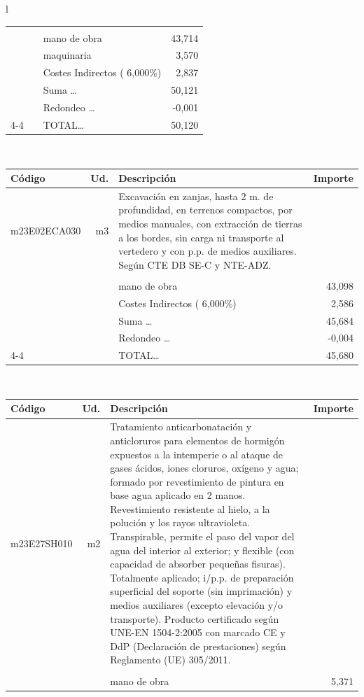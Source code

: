 \documentclass{book}%
\begin{document}
\begin{longtable}{l}
\begin{tabular}{l r p{60mm} r}
&&&\\%
&&mano de obra&    43,714\\%
&&maquinaria&     3,570\\%
&&Costes Indirectos (     6,000\%)&     2,837\\%
&&Suma \ldots&    50,121\\%
&&Redondeo \ldots&    {-}0,001\\%
\cline{4-4}%
&&TOTAL\ldots&    50,120\\%
\end{tabular}\\%
\begin{tabular}{l r p{60mm} r}%
Código&Ud.&Descripción&Importe\\%
\hline%
m23E02ECA030&m3&Excavación en zanjas, hasta 2 m. de profundidad, en terrenos compactos, por medios manuales, con extracción de tierras a los bordes, sin carga ni transporte al vertedero y con p.p. de medios auxiliares. Según CTE DB SE{-}C y NTE{-}ADZ.&\\%
&&&\\%
&&mano de obra&    43,098\\%
&&Costes Indirectos (     6,000\%)&     2,586\\%
&&Suma \ldots&    45,684\\%
&&Redondeo \ldots&    {-}0,004\\%
\cline{4-4}%
&&TOTAL\ldots&    45,680\\%
\end{tabular}\\%
\begin{tabular}{l r p{60mm} r}%
Código&Ud.&Descripción&Importe\\%
\hline%
m23E27SH010&m2&Tratamiento anticarbonatación y anticloruros para elementos de hormigón expuestos a la intemperie o al ataque de gases ácidos, iones cloruros, oxígeno y agua; formado por revestimiento de pintura en base agua aplicado en 2 manos. Revestimiento resistente al hielo, a la polución y los rayos ultravioleta. Transpirable, permite el paso del vapor del agua del interior al exterior; y flexible (con capacidad de absorber pequeñas fisuras). Totalmente aplicado; i/p.p. de preparación superficial del soporte (sin imprimación) y medios auxiliares (excepto elevación y/o transporte). Producto certificado según UNE{-}EN 1504{-}2:2005 con marcado CE y DdP (Declaración de prestaciones) según Reglamento (UE) 305/2011.&\\%
&&&\\%
&&mano de obra&     5,371\\%

\end{tabular}
\end{longtable}
\end{document}
